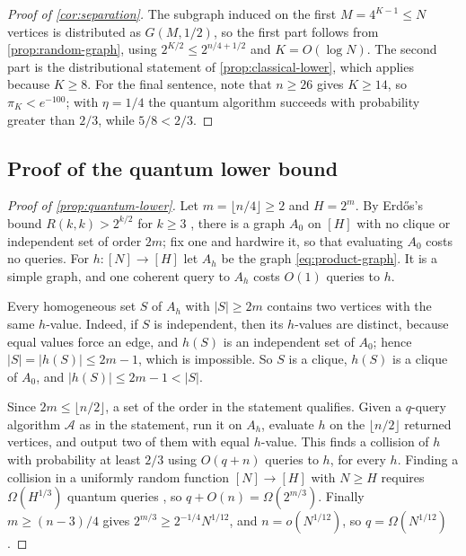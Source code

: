 \begin{proof}[Proof of \cref{cor:separation}]
The subgraph induced on the first $M=4^{K-1}\le N$ vertices is distributed
as $G(M,1/2)$, so the first part follows from \cref{prop:random-graph},
using $2^{K/2}\le2^{n/4+1/2}$ and $K=O(\log N)$.  The second part is the
distributional statement of \cref{prop:classical-lower}, which applies
because $K\ge8$.  For the final sentence, note that $n\ge26$ gives
$K\ge14$, so $\pi_K<e^{-100}$; with $\eta=1/4$ the quantum algorithm
succeeds with probability greater than $2/3$, while $5/8<2/3$.
\end{proof}

\subsection{Proof of the quantum lower bound}
\label{app:quantum-lower}

\begin{proof}[Proof of \cref{prop:quantum-lower}]
Let $m=\lfloor n/4\rfloor\ge2$ and $H=2^m$.  By Erd\H{o}s's bound
$R(k,k)>2^{k/2}$ for $k\ge3$ \cite{Erdos1947}, there is a graph $A_0$ on
$[H]$ with no clique or independent set of order $2m$; fix one and hardwire
it, so that evaluating $A_0$ costs no queries.  For $h\colon[N]\to[H]$ let
$A_h$ be the graph \cref{eq:product-graph}.  It is a simple graph, and one
coherent query to $A_h$ costs $O(1)$ queries to $h$.

Every homogeneous set $S$ of $A_h$ with $|S|\ge2m$ contains two vertices
with the same $h$-value.  Indeed, if $S$ is independent, then its $h$-values
are distinct, because equal values force an edge, and $h(S)$ is an
independent set of $A_0$; hence $|S|=|h(S)|\le2m-1$, which is impossible.
So $S$ is a clique, $h(S)$ is a clique of $A_0$, and $|h(S)|\le2m-1<|S|$.

Since $2m\le\lfloor n/2\rfloor$, a set of the order in the statement
qualifies.  Given a $q$-query algorithm $\mathcal A$ as in the statement,
run it on $A_h$, evaluate $h$ on the $\lfloor n/2\rfloor$ returned
vertices, and output two of them with equal $h$-value.  This finds a
collision of $h$ with probability at least $2/3$ using $O(q+n)$ queries to
$h$, for every $h$.  Finding a collision in a uniformly random function
$[N]\to[H]$ with $N\ge H$ requires $\Omega(H^{1/3})$ quantum queries
\cite{Zhandry2015,LiuZhandry2019}, so $q+O(n)=\Omega(2^{m/3})$.  Finally
$m\ge(n-3)/4$ gives $2^{m/3}\ge2^{-1/4}N^{1/12}$, and $n=o(N^{1/12})$, so
$q=\Omega(N^{1/12})$.
\end{proof}
